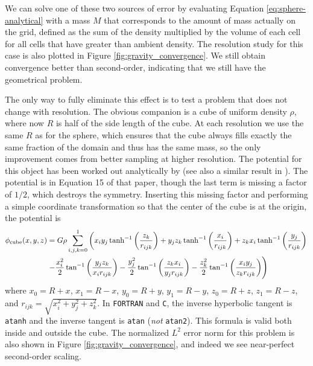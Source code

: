 \documentclass[12pt,preprint]{aastex}
\begin{document}
We can solve one of these two sources of error by evaluating Equation \ref{eq:sphere-analytical} with a mass $M$ that corresponds to the amount of mass actually on the grid, defined as the sum of the density multiplied by the volume of each cell for all cells that have greater than ambient density. The resolution study for this case is also plotted in Figure \ref{fig:gravity_convergence}. We still obtain convergence better than second-order, indicating that we still have the geometrical problem.

The only way to fully eliminate this effect is to test a problem that does not change with resolution. The obvious companion is a cube of uniform density $\rho$, where now $R$ is half of the side length of the cube. At each resolution we use the same $R$ as for the sphere, which ensures that the cube always fills exactly the same fraction of the domain and thus has the same mass, so the only improvement comes from better sampling at higher resolution. The potential for this object has been worked out analytically by \cite{waldvogel:1976} (see also a similar result in \cite{hummer:1996}). The potential is in Equation 15 of that paper, though the last term is missing a factor of $1/2$, which destroys the symmetry. Inserting this missing factor and performing a simple coordinate transformation so that the center of the cube is at the origin, the potential is
\begin{align}
  \phi_{\text{cube}}(x,y,z) &= G\rho\sum_{i,j,k=0}^1\left(x_i y_j\, \text{tanh}^{-1}\left(\frac{z_k}{r_{ijk}}\right) + y_j z_k\, \text{tanh}^{-1}\left(\frac{x_i}{r_{ijk}}\right) + z_k x_i\, \text{tanh}^{-1}\left(\frac{y_j}{r_{ijk}}\right) \right.\notag \\
  &\left. - \frac{x_i^2}{2}\,\text{tan}^{-1}\left(\frac{y_j z_k}{x_i r_{ijk}}\right) - \frac{y_j^2}{2}\,\text{tan}^{-1}\left(\frac{z_k x_i}{y_j r_{ijk}}\right) - \frac{z_k^2}{2}\,\text{tan}^{-1}\left(\frac{x_i y_j}{z_k r_{ijk}}\right)\right)
\end{align}
where $x_0 = R + x$, $x_1 = R - x$, $y_0 = R + y$, $y_1 = R-y$, $z_0 = R+z$, $z_1 = R-z$, and $r_{ijk} = \sqrt{x_i^2 + y_j^2 + z_k^2}$. In \texttt{FORTRAN} and \texttt{C}, the inverse hyperbolic tangent is \texttt{atanh} and the inverse tangent is \texttt{atan} (\textit{not} \texttt{atan2}). This formula is valid both inside and outside the cube. The normalized $L^2$ error norm for this problem is also shown in Figure \ref{fig:gravity_convergence}, and indeed we see near-perfect second-order scaling.
\end{document}
